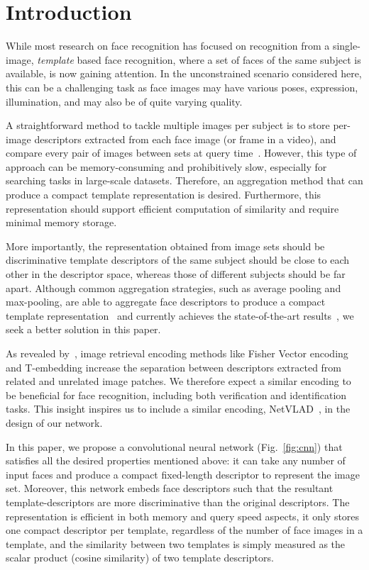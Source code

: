 \documentclass[runningheads]{llncs}
\begin{document}
\section{Introduction}
\label{sec:intro}
While most research on face recognition 
has  focused on recognition from a single-image, 
 {\em template} based  face recognition, where a set of faces of the same subject is available,
is now gaining attention.
In the  unconstrained scenario considered here, this  can be a challenging task as
face images may have 
various poses,  expression, illumination, and may also be of quite varying quality.

A straightforward method to tackle multiple images per 
subject is to store per-image descriptors extracted 
from each face image (or frame in a video), and 
compare every  pair of images between sets at query 
time~\cite{Taigman14,Schroff15}. 
However, this type of approach can be 
memory-consuming and prohibitively 
slow, especially for searching tasks in large-scale datasets.
Therefore, an aggregation method that can 
produce a compact template representation is desired. 
Furthermore, this representation should 
support efficient computation of similarity 
and require minimal memory storage. 

More importantly, the representation 
obtained from image sets should be 
discriminative 
\ie template descriptors of the same subject 
should be close to each other in the descriptor space, 
whereas those of different subjects should be far apart.
Although common aggregation strategies, such as 
average pooling and max-pooling, are able to
aggregate face descriptors to
produce a compact template 
representation~\cite{Parkhi15,Chen15,Cao18} 
and currently achieves the state-of-the-art results~\cite{Cao18},
we seek a better solution in this paper.

As revealed by~\cite{Jegou14}, image retrieval encoding 
methods like Fisher Vector encoding 
and T-embedding increase the separation between 
descriptors extracted from related 
and unrelated image patches. 
We therefore expect a similar encoding to be beneficial 
for  face recognition, including both verification and 
identification tasks. This insight inspires us 
to include a similar encoding, NetVLAD~\cite{Arandjelovic16},  in the design of our 
network.

In this paper, we propose a convolutional neural network (Fig.~\ref{fig:cnn})
that satisfies all the desired properties mentioned above: 
it can take any number of input faces and 
produce a compact fixed-length descriptor to represent 
the image set. Moreover, this network
embeds face descriptors such that the resultant template-descriptors 
are  more discriminative than the original descriptors.
The 
representation is efficient in both 
memory and query speed aspects, \ie  it only stores 
one compact descriptor per template, regardless of the number 
of face images in a template, and the similarity 
between two templates is simply measured as the 
scalar product (\ie cosine similarity) 
of two template descriptors. 
\end{document}
